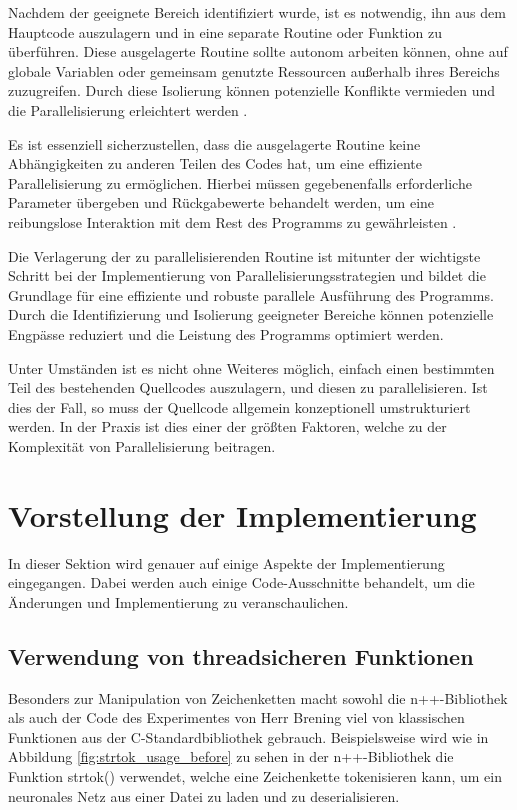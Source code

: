 Nachdem der geeignete Bereich identifiziert wurde, ist es notwendig, ihn aus dem Hauptcode auszulagern und in eine separate Routine oder Funktion zu überführen. Diese ausgelagerte Routine sollte autonom arbeiten können, ohne auf globale Variablen oder gemeinsam genutzte Ressourcen außerhalb ihres Bereichs zuzugreifen. Durch diese Isolierung können potenzielle Konflikte vermieden und die Parallelisierung erleichtert werden \citep{wilkinson2006parallel}.

Es ist essenziell sicherzustellen, dass die ausgelagerte Routine keine Abhängigkeiten zu anderen Teilen des Codes hat, um eine effiziente Parallelisierung zu ermöglichen. Hierbei müssen gegebenenfalls erforderliche Parameter übergeben und Rückgabewerte behandelt werden, um eine reibungslose Interaktion mit dem Rest des Programms zu gewährleisten \citep{wilkinson2006parallel}.

Die Verlagerung der zu parallelisierenden Routine ist mitunter der wichtigste Schritt bei der Implementierung von Parallelisierungsstrategien und bildet die Grundlage für eine effiziente und robuste parallele Ausführung des Programms. Durch die Identifizierung und Isolierung geeigneter Bereiche können potenzielle Engpässe reduziert und die Leistung des Programms optimiert werden.

Unter Umständen ist es nicht ohne Weiteres möglich, einfach einen bestimmten Teil des bestehenden Quellcodes auszulagern, und diesen zu parallelisieren. Ist dies der Fall, so muss der Quellcode allgemein konzeptionell umstrukturiert werden. In der Praxis ist dies einer der größten Faktoren, welche zu der Komplexität von Parallelisierung beitragen.

\section{Vorstellung der Implementierung}
\label{sec:Vorstellung_Implementierung}

In dieser Sektion wird genauer auf einige Aspekte der Implementierung eingegangen. Dabei werden auch einige Code-Ausschnitte behandelt, um die Änderungen und Implementierung zu veranschaulichen. 


\subsection{Verwendung von threadsicheren Funktionen}
\label{sec:Verwendung_threadsichere_Funktionen}

Besonders zur Manipulation von Zeichenketten macht sowohl die n++-Bibliothek als auch der Code des Experimentes von Herr Brening viel von klassischen Funktionen aus der C-Standardbibliothek gebrauch. Beispielsweise wird wie in Abbildung \ref{fig:strtok_usage_before} zu sehen in der n++-Bibliothek die Funktion strtok() verwendet, welche eine Zeichenkette tokenisieren kann, um ein neuronales Netz aus einer Datei zu laden und zu deserialisieren. 

